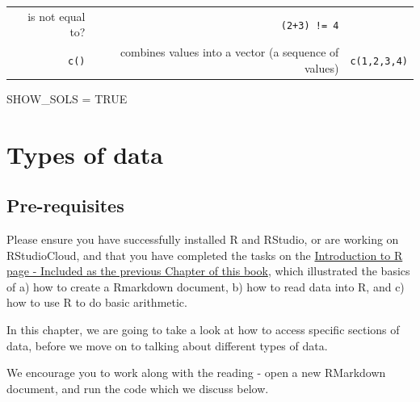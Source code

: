 \documentclass[]{book}
\newenvironment{Shaded}{\begin{snugshade}}{\end{snugshade}}
\newcommand{\NormalTok}[1]{#1}
\newcommand{\OtherTok}[1]{\textcolor[rgb]{0.56,0.35,0.01}{#1}}
\newcommand{\StringTok}[1]{\textcolor[rgb]{0.31,0.60,0.02}{#1}}
\begin{document}
\begin{longtable}[]{@{}rrr@{}}
\begin{minipage}[t]{0.30\columnwidth}
is not equal to?\strut
\end{minipage} & \begin{minipage}[t]{0.30\columnwidth}\raggedleft
\texttt{(2+3)\ !=\ 4}\strut
\end{minipage}\tabularnewline
\begin{minipage}[t]{0.30\columnwidth}\raggedleft
\texttt{c()}\strut
\end{minipage} & \begin{minipage}[t]{0.30\columnwidth}\raggedleft
combines values into a vector (a sequence of values)\strut
\end{minipage} & \begin{minipage}[t]{0.30\columnwidth}\raggedleft
\texttt{c(1,2,3,4)}\strut
\end{minipage}\tabularnewline
\bottomrule
\end{longtable}

\begin{Shaded}
\begin{Highlighting}[]
\NormalTok{SHOW_SOLS =}\StringTok{ }\OtherTok{TRUE}
\end{Highlighting}
\end{Shaded}

\hypertarget{chap-data-types}{%
\chapter{Types of data}\label{chap-data-types}}

\hypertarget{pre-requisites}{%
\section*{Pre-requisites}\label{pre-requisites}}

Please ensure you have successfully installed R and RStudio, or are working on RStudioCloud, and that you have completed the tasks on the \protect\hyperlink{chap-intro}{Introduction to R page - Included as the previous Chapter of this book}, which illustrated the basics of a) how to create a Rmarkdown document, b) how to read data into R, and c) how to use R to do basic arithmetic.

In this chapter, we are going to take a look at how to access specific sections of data, before we move on to talking about different types of data.

We encourage you to work along with the reading - open a new RMarkdown document, and run the code which we discuss below.
\end{document}
